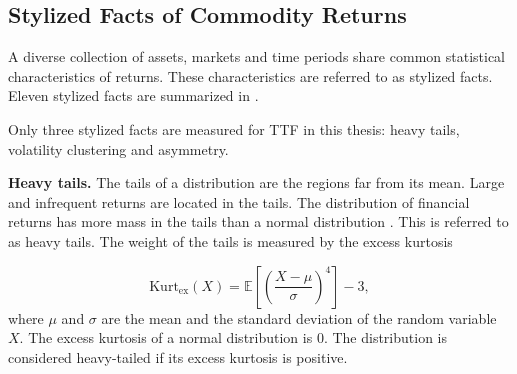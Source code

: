 \subsection{Stylized Facts of Commodity Returns}
A diverse collection of assets, markets and time periods share common statistical characteristics of returns. These characteristics are referred to as stylized facts. Eleven stylized facts are summarized in \textcite{contEmpiricalPropertiesAsset2001}. 

Only three stylized facts are measured for TTF in this thesis: heavy tails, volatility clustering and asymmetry. 

\textbf{Heavy tails.} The tails of a distribution are the regions far from its mean. Large and infrequent returns are located in the tails. The distribution of financial returns has more mass in the tails than a normal distribution \parencite{contEmpiricalPropertiesAsset2001}. This is referred to as heavy tails. The weight of the tails is measured by the excess kurtosis

\begin{equation}
    \mathrm{Kurt}_{\mathrm{ex}}(X) = \mathbb{E}\!\left[\left(\frac{X-\mu}{\sigma}\right)^{4}\right] - 3,
    \label{eq:kurtosis}
\end{equation}
where $\mu$ and $\sigma$ are the mean and the standard deviation of the random variable $X$. The excess kurtosis of a normal distribution is 0. The distribution is considered heavy-tailed if its excess kurtosis is positive. 


